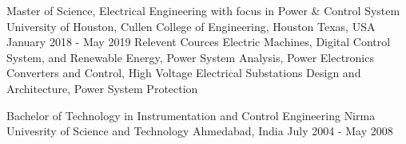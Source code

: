 \begin{cventries}
	\cvedu
	{Master of Science, Electrical Engineering with focus in Power \& Control System} %
	{University of Houston, Cullen College of Engineering, Houston} %
	{Texas, USA} %
	{January 2018 - May 2019} %
	\cvprojentry
	{Relevent Cources}
	{Electric Machines, Digital Control System, and Renewable Energy, Power System Analysis, Power
		Electronics Converters and Control, High Voltage Electrical Substations Design and Architecture, Power System Protection
	}
\end{cventries}
\begin{cventries}
	\cvedu
	{Bachelor of Technology in Instrumentation and Control Engineering} %
	{Nirma Univesrity of Science and Technology} %
	{Ahmedabad, India} %
	{July 2004 - May 2008} %
\end{cventries}


